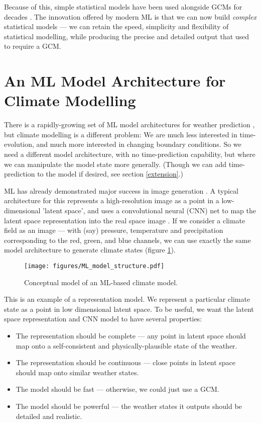 \documentclass[gmd]{copernicus}
\begin{document}
Because of this, simple statistical models have been used alongside GCMs for decades \citep{MAGICC}. The innovation offered by modern ML is that we can now build {\it complex} statistical models --- we can retain the speed, simplicity and flexibility of statistical modelling, while producing the precise and detailed output that used to require a GCM.

\section{An ML Model Architecture for Climate Modelling}

There is a rapidly-growing set of ML model architectures for weather prediction \citep{keisler2022forecasting,bi2022panguweather,nguyen2023climax}, but climate modelling is a different problem: We are much less interested in time-evolution, and much more interested in changing boundary conditions. So we need a different model architecture, with no time-prediction capability, but where we can manipulate the model state more generally. (Though we can add time-prediction to the model if desired, see section \ref{extension}.)

ML has already demonstrated major success in image generation \citep{StyleGAN2,Stable_Diffusion}. A typical architecture for this represents a high-resolution image as a point in a low-dimensional 'latent space', and uses a convolutional neural (CNN) net to map the latent space representation into the real space image \citep{StyleGAN}. If we consider a climate field as an image --- with (say) pressure, temperature and precipitation corresponding to the red, green, and blue channels, we can use exactly the same model architecture to generate climate states (figure \ref{ML_model_structure}).

\begin{figure}[h]
\texttt{[image: figures/ML\_model\_structure.pdf]}
\caption{Conceptual model of an ML-based climate model.}
\label{ML_model_structure}
\end{figure}

This is an example of a representation model. We represent a particular climate state as a point in low dimensional latent space. To be useful, we want the latent space representation and CNN model to have several properties:
\begin{itemize}
    \item The representation should be complete --- any point in latent space should map onto a self-consistent and physically-plausible state of the weather.
    \item The representation should be continuous --- close points in latent space should map onto similar weather states.
    \item The model should be fast --- otherwise, we could just use a GCM.
    \item The model should be powerful --- the weather states it outputs should be detailed and realistic.
\end{itemize}
\end{document}
